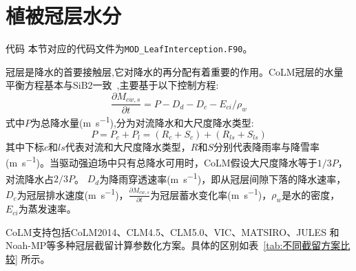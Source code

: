 
\chapter{植被冠层水分}\label{植被冠层截留}

\begin{mymdframed}{代码}
本节对应的代码文件为\texttt{MOD\_LeafInterception.F90}。
\end{mymdframed}

冠层是降水的首要接触层,它对降水的再分配有着重要的作用。CoLM冠层的水量平衡方程基本与SiB2一致~\citep{sellers1996revised},主要基于以下控制方程:
\begin{equation}\label{eq:冠层水量控制方程}
\frac{\partial M_{cw,s}}{\partial t} = P-D_{d}-D_{c}-E_{ci} / \rho_{w}
\end{equation}
式中$P$为总降水量(\unit{m.s^{-1}}),分为对流降水和大尺度降水类型:
\begin{equation}\label{eq:降水类型}
P=P_{c}+P_{l}=\left(R_{c}+S_{c}\right)+\left(R_{ls}+S_{ls}\right)
\end{equation}
其中下标$c$和$ls$代表对流和大尺度降水类型，$R$和$S$分别代表降雨率与降雪率(\unit{m.s^{-1}})。当驱动强迫场中只有总降水可用时，CoLM假设大尺度降水等于$1/3P$，对流降水占$2/3P$。
$D_d$为降雨穿透速率(\unit{m.s^{-1}})，即从冠层间隙下落的降水速率，$D_c$为冠层排水速度(\unit{m.s^{-1}})，$\frac{\partial M_{cw,s}}{\partial t}$为冠层蓄水变化率(\unit{m.s^{-1}})，$\rho_w$是水的密度，$E_{ci}$为蒸发速率。

CoLM支持包括CoLM2014、CLM4.5、CLM5.0、VIC、MATSIRO、JULES 和Noah-MP等多种冠层截留计算参数化方案。具体的区别如表~\ref{tab:不同截留方案比较} 所示。

